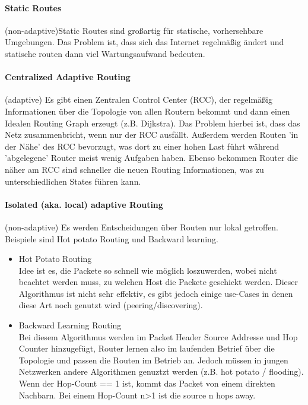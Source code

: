 			\paragraph{Static Routes}
				(non-adaptive)Static Routes sind großartig für statische, vorhersehbare Umgebungen. Das Problem ist, dass sich das Internet regelmäßig ändert und statische routen dann viel Wartungsaufwand bedeuten. 
			
			\paragraph{Centralized Adaptive Routing}
				(adaptive) Es gibt einen Zentralen Control Center (RCC), der regelmäßig Informationen über die Topologie von allen Routern bekommt und dann einen Idealen Routing Graph erzeugt (z.B. Dijkstra). Das Problem hierbei ist, dass das Netz zusammenbricht, wenn nur der RCC ausfällt. Außerdem werden Routen 'in der Nähe' des RCC bevorzugt, was dort zu einer hohen Last führt während 'abgelegene' Router meist wenig Aufgaben haben. Ebenso bekommen Router die näher am RCC sind schneller die neuen Routing Informationen, was zu unterschiedlichen States führen kann.
				
			\paragraph{Isolated (aka. local) adaptive Routing}
				(non-adaptive) Es werden Entscheidungen über Routen nur lokal getroffen. Beispiele sind Hot potato Routing und Backward learning. 
				\begin{itemize}
					\item Hot Potato Routing \\
						Idee ist es, die Packete so schnell wie möglich loszuwerden, wobei nicht beachtet werden muss, zu welchen Host die Packete geschickt werden. Dieser Algorithmus ist nicht sehr effektiv, es gibt jedoch einige use-Cases in denen diese Art noch genutzt wird (peering/discovering).
					\item Backward Learning Routing \\
						Bei diesem Algorithmus werden im Packet Header Source Addresse und Hop Counter hinzugefügt, Router lernen also im laufenden Betrief über die Topologie und passen die Routen im Betrieb an. Jedoch müssen in jungen Netzwerken andere Algorithmen genuztzt werden (z.B. hot potato / flooding). Wenn der Hop-Count == 1 ist, kommt das Packet von einem direkten Nachbarn. Bei einem Hop-Count n>1 ist die source n hops away. 
				\end{itemize}
			
